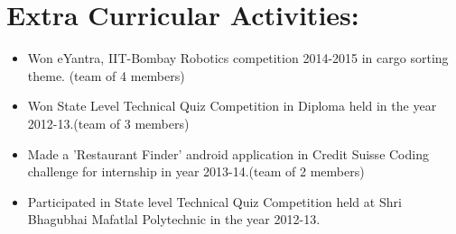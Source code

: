 \documentclass[a4 paper,12pt]{article}
\begin{document}
\begin{minipage}{0.98\textwidth}
\section{Extra Curricular Activities:}
\begin{itemize}
	\vspace{-0.1in}
	\item Won eYantra, IIT-Bombay Robotics competition 2014-2015 in cargo sorting theme. (team of 4 members)
	\item Won State Level Technical Quiz Competition in Diploma held in the year 2012-13.(team of 3 members)
	\item Made a 'Restaurant Finder' android application in Credit Suisse Coding challenge for internship in year 2013-14.(team of 2 members)
	\item Participated in State level Technical Quiz Competition held at Shri Bhagubhai Mafatlal Polytechnic in the year 2012-13.
\end{itemize}
\end{minipage}
\end{document}
